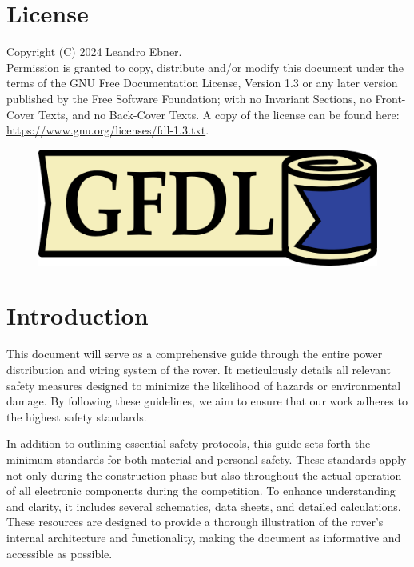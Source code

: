 \section{License}

    Copyright (C)  2024 Leandro Ebner. \\
    Permission is granted to copy, distribute and/or modify this document under the terms of the GNU Free Documentation License, Version 1.3 or any later version published by the Free Software Foundation; with no Invariant Sections, no Front-Cover Texts, and no Back-Cover Texts. A copy of the license can be found here:
    \href{https://www.gnu.org/licenses/fdl-1.3.txt}{https://www.gnu.org/licenses/fdl-1.3.txt}.

    \begin{figure}[h!]
    \includegraphics{contents/figures/gfdl-logo.png}
    \end{figure}     
    
\section{Introduction}

    This document will serve as a comprehensive guide through the entire power distribution and wiring system of the rover. It meticulously details all relevant safety measures designed to minimize the likelihood of hazards or environmental damage. By following these guidelines, we aim to ensure that our work adheres to the highest safety standards. 

    \vspace{5mm}

    In addition to outlining essential safety protocols, this guide sets forth the minimum standards for both material and personal safety. These standards apply not only during the construction phase but also throughout the actual operation of all electronic components during the competition. To enhance understanding and clarity, it includes several schematics, data sheets, and detailed calculations. These resources are designed to provide a thorough illustration of the rover's internal architecture and functionality, making the document as informative and accessible as possible.

